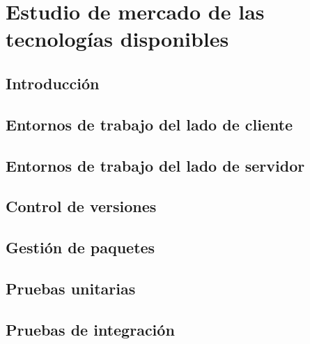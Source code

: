 \documentclass[
  a4paper,  %
  twoside,  %
  bibliography=totoc,
  headsepline,
  cleardoublepage=empty,
  parskip=half,
  draft=false
]{scrbook}
\begin{document}


\chapter{Estudio de mercado de las tecnologías disponibles}
\label{chap:techMarketResearch}

\section{Introducción}



\section{Entornos de trabajo del lado de cliente}



\section{Entornos de trabajo del lado de servidor}



\section{Control de versiones}



\section{Gestión de paquetes}


\label{section:packet-manager}

\section{Pruebas unitarias}
\label{section:unit-testing}



\section{Pruebas de integración}
\label{section:integration-testing}
\end{document}
